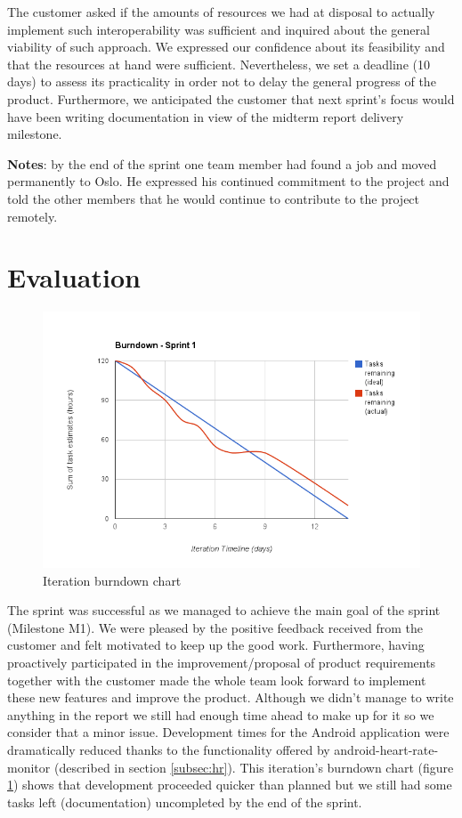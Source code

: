 The customer asked if the amounts of resources we had at disposal to actually implement such interoperability
was sufficient and inquired about the general viability of such approach.
We expressed our confidence about its feasibility and that the resources at hand were sufficient.
Nevertheless, we set a deadline (10 days) to assess its practicality in order not to delay the general progress of the product.
Furthermore, we anticipated the customer that next sprint's focus would have been writing documentation in view
of the midterm report delivery milestone.

\textbf{Notes}: by the end of the sprint one team member had found a job and moved permanently to Oslo.
He expressed his continued commitment to the project and told the other members that he would continue
to contribute to the project remotely.

\section{Evaluation}

\begin{figure}
\centering
\includegraphics[scale=0.60]{../Figures/burndownSprint1.png}
\caption{Iteration burndown chart}
\label{figure:burndownsprint1}
\end{figure}

The sprint was successful as we managed to achieve the main goal of the sprint (Milestone M1).
We were pleased by the positive feedback received from the customer and felt motivated to keep up the good work. 
Furthermore, having proactively participated in the improvement/proposal of product requirements together with the customer made the whole team look forward to implement these new features and improve the product. 
Although we didn't manage to write anything in the report we still had enough time ahead to make up for it so we consider that a minor issue.
Development times for the Android application were dramatically reduced thanks to the functionality offered by android-heart-rate-monitor (described in section \ref{subsec:hr}).
This iteration's burndown chart (figure \ref{figure:burndownsprint1}) shows that development proceeded quicker than planned but we still had some tasks left (documentation) uncompleted by the end of the sprint.

